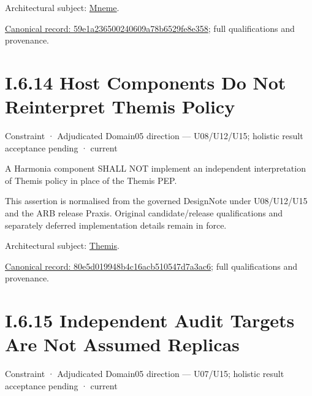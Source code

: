 Architectural subject: \hyperref[element:1af8a56358f7429fabfb57be66542a99]{Mneme}.


{\footnotesize \href{../../../../../../../../continuum/motivation/constraint/59e1a236500240609a78b6529fe8e358.md}{Canonical record: 59e1a236500240609a78b6529fe8e358}; full qualifications and provenance.}\par
\section*{I.6.14 Host Components Do Not Reinterpret Themis Policy}
\label{navigation:I.6.14}

\label{element:80e5d019948b4c16acb510547d7a3ac6}
{\small Constraint · Adjudicated Domain05 direction — U08/U12/U15; holistic result acceptance pending · current}\par

A Harmonia component SHALL NOT implement an independent interpretation of Themis policy in place of the Themis PEP.



This assertion is normalised from the governed DesignNote under U08/U12/U15 and the ARB release Praxis. Original candidate/release qualifications and separately deferred implementation details remain in force.



Architectural subject: \hyperref[element:899d34ec491948b68aad09e507dea6d1]{Themis}.


{\footnotesize \href{../../../../../../../../continuum/motivation/constraint/80e5d019948b4c16acb510547d7a3ac6.md}{Canonical record: 80e5d019948b4c16acb510547d7a3ac6}; full qualifications and provenance.}\par
\section*{I.6.15 Independent Audit Targets Are Not Assumed Replicas}
\label{navigation:I.6.15}

\label{element:e84fc7e020474eda99a0e32def0a6371}
{\small Constraint · Adjudicated Domain05 direction — U07/U15; holistic result acceptance pending · current}\par

